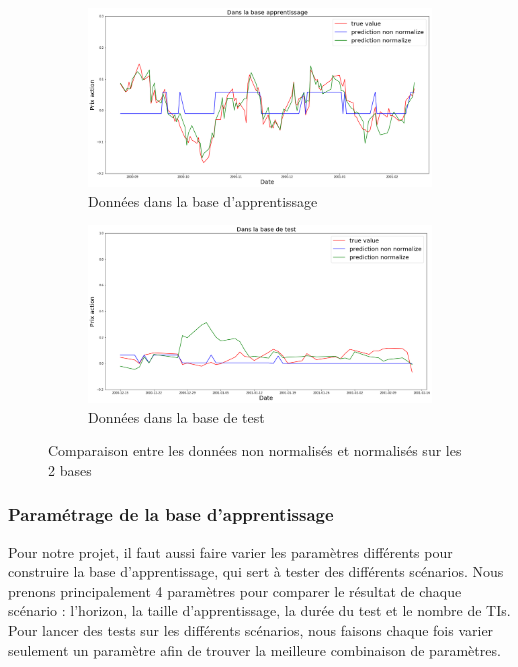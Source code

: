 \begin{figure}[H]
\centering
	\begin{subfigure}{.5\textwidth}
	\centering
	\includegraphics[width=.9\linewidth, scale=0.2]
	{plot/norma.png}
	\caption{Données dans la base d'apprentissage}
	\label{fig:Base_A}
	\end{subfigure}%
	\begin{subfigure}{.5\textwidth}
	\centering
	\includegraphics[width=.9\linewidth, scale=0.2]
	{plot/non_norma.png}
	\caption{Données dans la base de test}
	\label{fig:Base_T}
	\end{subfigure}
\caption{Comparaison entre les données non normalisés et normalisés sur les 2 bases}
\label{fig: normalisation}
\end{figure}

\subsubsection{Paramétrage de la base d'apprentissage}

Pour notre projet, il faut aussi faire varier les paramètres différents pour construire la base d'apprentissage, qui sert à tester des différents scénarios. Nous prenons principalement 4 paramètres pour comparer le résultat de chaque scénario : l'horizon, la taille d'apprentissage, la durée du test et le nombre de TIs. Pour lancer des tests sur les différents scénarios, nous faisons chaque fois varier seulement un paramètre afin de trouver la meilleure combinaison de paramètres.\\

